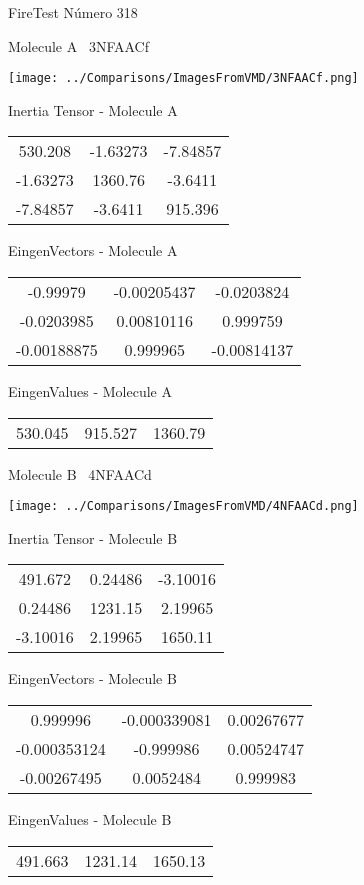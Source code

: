 \vtab[-3cm]
\begin{center}
{\large FireTest \tab Número 318}
\end{center}
\begin{multicols}{2}
\begin{center}

Molecule A \
3NFAACf

\texttt{[image: ../Comparisons/ImagesFromVMD/3NFAACf.png]}

Inertia Tensor - Molecule A \\
\begin{tabular}{|c c c|}
530.208	 & 	-1.63273	 & 	-7.84857	 \\
-1.63273	 & 	1360.76	 & 	-3.6411	 \\
-7.84857	 & 	-3.6411	 & 	915.396
\end{tabular}

\vtab
 EingenVectors - Molecule A     \\
\begin{tabular}{|c c c|}
-0.99979	 & 	-0.00205437	 & 	-0.0203824	 \\
-0.0203985	 & 	0.00810116	 & 	0.999759	 \\
-0.00188875	 & 	0.999965	 & 	-0.00814137
\end{tabular}

\vtab
 EingenValues - Molecule A     \\
\begin{tabular}{|c c c|}
530.045	 & 	915.527	 & 	1360.79	 \\
\end{tabular}
\columnbreak

Molecule B \
4NFAACd

\texttt{[image: ../Comparisons/ImagesFromVMD/4NFAACd.png]}

Inertia Tensor - Molecule B \\
\begin{tabular}{|c c c|}
491.672	 & 	0.24486	 & 	-3.10016	 \\
0.24486	 & 	1231.15	 & 	2.19965	 \\
-3.10016	 & 	2.19965	 & 	1650.11
\end{tabular}

\vtab
 EingenVectors - Molecule B     \\
\begin{tabular}{|c c c|}
0.999996	 & 	-0.000339081	 & 	0.00267677	 \\
-0.000353124	 & 	-0.999986	 & 	0.00524747	 \\
-0.00267495	 & 	0.0052484	 & 	0.999983
\end{tabular}

\vtab
 EingenValues - Molecule B     \\
\begin{tabular}{|c c c|}
491.663	 & 	1231.14	 & 	1650.13	 \\
\end{tabular}

\end{center}
\end{multicols}

